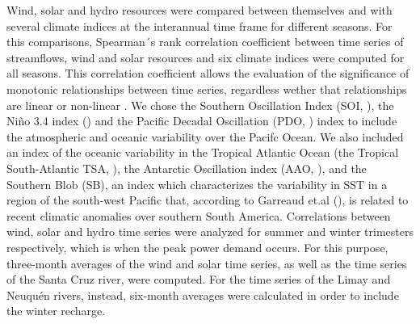 \documentclass[AMA,Times1COL]{WileyNJDv5} %
\begin{document}
\begin{linenumbers}
Wind, solar and hydro resources were compared between themselves and with several climate indices at the interannual time frame for different seasons. For this comparisons, Spearman´s rank correlation coefficient between time series of streamflows, wind and solar resources and six climate indices were computed for all seasons. This correlation coefficient allows the evaluation of the significance of monotonic relationships between time series, regardless wether that relationships are linear or non-linear \cite{zar2014spearman}. We chose the Southern Oscillation Index (SOI, \cite{ropelewski1987extension}), the Niño 3.4 index (\cite{rayner2003global}) and the Pacific Decadal Oscillation (PDO, \cite{mantua1997pacific}) index to include the atmospheric and oceanic variability over the Pacifc Ocean.  We also included an index of the oceanic variability in the Tropical Atlantic Ocean (the Tropical South-Atlantic TSA, \cite{enfield1999ubiquitous}), the Antarctic Oscillation index (AAO, \cite{mo2000relationships}), and the Southern Blob (SB), an index which characterizes the variability in SST in a region of the south-west Pacific that, according to Garreaud et.al (\cite{garreaud2021south}), is related to recent climatic anomalies over southern South America. Correlations between wind, solar and hydro time series were analyzed for summer and winter trimesters respectively, which is when the peak power demand occurs. For this purpose, three-month averages of the wind and solar time series, as well as the time series of the Santa Cruz river, were computed. For the time series of the Limay and Neuquén rivers, instead, six-month averages were calculated in order to include the winter recharge.


\end{linenumbers}
\end{document}
